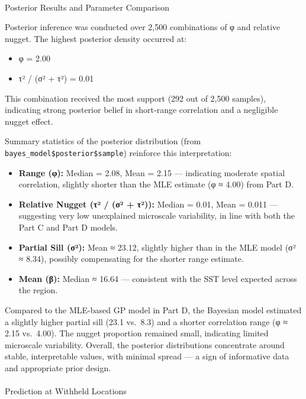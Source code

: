 \documentclass[
  11pt,
]{article}
\makeatletter
\let\oldparagraph\paragraph
\renewcommand{\paragraph}{
    \@ifstar
      \xxxParagraphStar
      \xxxParagraphNoStar
  }
\newcommand{\xxxParagraphStar}[1]{\oldparagraph*{#1}\mbox{}}
\newcommand{\xxxParagraphNoStar}[1]{\oldparagraph{#1}\mbox{}}
\providecommand{\tightlist}{%
  \setlength{\itemsep}{0pt}\setlength{\parskip}{0pt}}\usepackage{longtable,booktabs,array}
\makeatother
\begin{document}
\paragraph{Posterior Results and Parameter
Comparison}\label{posterior-results-and-parameter-comparison}

Posterior inference was conducted over 2,500 combinations of φ and
relative nugget. The highest posterior density occurred at:

\begin{itemize}
\tightlist
\item
  φ = 2.00\\
\item
  τ² / (σ² + τ²) = 0.01
\end{itemize}

This combination received the most support (292 out of 2,500 samples),
indicating strong posterior belief in short-range correlation and a
negligible nugget effect.

Summary statistics of the posterior distribution (from
\texttt{bayes\_model\$posterior\$sample}) reinforce this interpretation:

\begin{itemize}
\tightlist
\item
  \textbf{Range (φ):} Median = 2.08, Mean = 2.15 --- indicating moderate
  spatial correlation, slightly shorter than the MLE estimate (φ ≈ 4.00)
  from Part D.
\item
  \textbf{Relative Nugget (τ² / (σ² + τ²)):} Median = 0.01, Mean = 0.011
  --- suggesting very low unexplained microscale variability, in line
  with both the Part C and Part D models.
\item
  \textbf{Partial Sill (σ²):} Mean ≈ 23.12, slightly higher than in the
  MLE model (σ² ≈ 8.34), possibly compensating for the shorter range
  estimate.
\item
  \textbf{Mean (β):} Median ≈ 16.64 --- consistent with the SST level
  expected across the region.
\end{itemize}

Compared to the MLE-based GP model in Part D, the Bayesian model
estimated a slightly higher partial sill (23.1 vs.~8.3) and a shorter
correlation range (φ ≈ 2.15 vs.~4.00). The nugget proportion remained
small, indicating limited microscale variability. Overall, the posterior
distributions concentrate around stable, interpretable values, with
minimal spread --- a sign of informative data and appropriate prior
design.

\paragraph{Prediction at Withheld
Locations}\label{prediction-at-withheld-locations}
\end{document}
